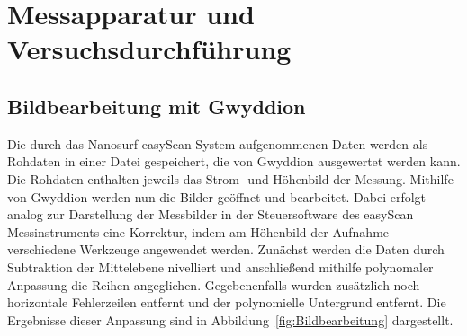 \documentclass[a4paper,twoside,final]{article}
\begin{document}
\section{Messapparatur und Versuchsdurchführung} \label{sec:Versuchsdurchführung}
\captionsetup[subfigure]{justification=justified,singlelinecheck=false} %
\subsection{Bildbearbeitung mit Gwyddion}
Die durch das Nanosurf easyScan System aufgenommenen Daten werden als Rohdaten in einer Datei gespeichert, die von Gwyddion ausgewertet werden kann. Die Rohdaten enthalten jeweils das Strom- und Höhenbild der Messung. Mithilfe von Gwyddion werden nun die Bilder geöffnet und bearbeitet. Dabei erfolgt analog zur Darstellung der Messbilder in der Steuersoftware des easyScan Messinstruments eine Korrektur, indem am Höhenbild der Aufnahme verschiedene Werkzeuge angewendet werden. Zunächst werden die Daten durch Subtraktion der Mittelebene nivelliert und anschließend mithilfe polynomaler Anpassung die Reihen angeglichen. Gegebenenfalls wurden zusätzlich noch horizontale Fehlerzeilen entfernt und der polynomielle Untergrund entfernt. Die Ergebnisse dieser Anpassung sind in Abbildung~\ref{fig:Bildbearbeitung} dargestellt.
\end{document}
